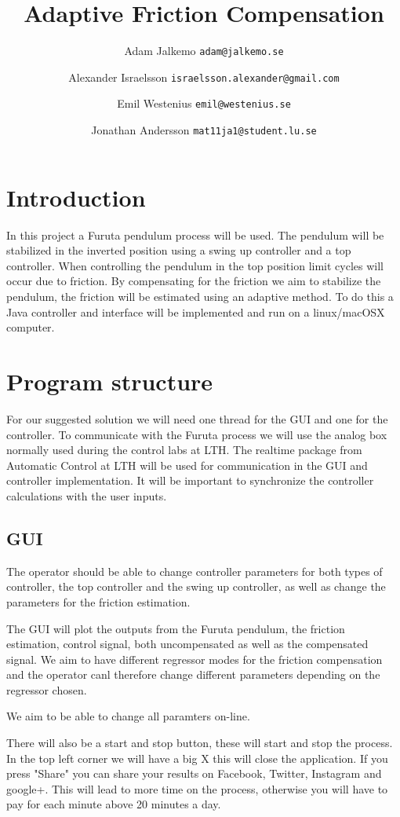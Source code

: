\documentclass[10pt,a4paper]{article}
\author{Adam Jalkemo \texttt{adam@jalkemo.se} \and
Alexander Israelsson \texttt{israelsson.alexander@gmail.com} \and
Emil Westenius \texttt{emil@westenius.se} \and
Jonathan Andersson \texttt{mat11ja1@student.lu.se}}
\title{Adaptive Friction Compensation}
\begin{document}
\maketitle

\section{Introduction}
In this project a Furuta pendulum process will be used. The pendulum will be stabilized in the inverted position using a swing up controller and a top controller. When controlling the pendulum in the top position limit cycles will occur due to friction. By compensating for the friction we aim to stabilize the pendulum, the friction will be estimated using an adaptive method. To do this a Java controller and interface will be implemented and run on a linux/macOSX computer.
\section{Program structure}
For our suggested solution we will need one thread for the GUI and one for the controller. To communicate with the Furuta process we will use the analog box normally used during the control labs at LTH. The realtime package from Automatic Control at LTH will be used for communication in the GUI and controller implementation. It will be important to synchronize the controller calculations with the user inputs. 


\subsection{GUI}
The operator should be able to change controller parameters for both types of controller, the top controller and the swing up controller, as well as change the parameters for the friction estimation. 

The GUI will plot the outputs from the Furuta pendulum, the friction estimation, control signal, both uncompensated as well as the compensated signal. We aim to have different regressor modes for the friction compensation and the operator canl therefore change different parameters depending on the regressor chosen. 

We aim to be able to change all paramters on-line.

There will also be a start and stop button, these will start and stop the process. In the top left corner we will have a big X this will close the application. If you press "Share" you can share your results on Facebook, Twitter, Instagram and google+. This will lead to more time on the process, otherwise you will have to pay for each minute above 20 minutes a day. 
\end{document}
